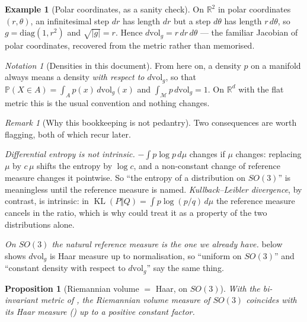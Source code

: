 \documentclass[11pt,a4paper]{report}
\newtheorem{proposition}[proposition]{Proposition}
\theoremstyle{definition}
\newtheorem{example}[example]{Example}
\theoremstyle{remark}
\newtheorem{remark}[remark]{Remark}
\newtheorem{notation}[notation]{Notation}
\DeclareMathOperator{\KL}{KL}
\newcommand{\RR}{\mathbb R}
\newcommand{\PP}{\mathbb P}
\begin{document}
\begin{example}[Polar coordinates, as a sanity check]
\label{ex:polar-volume}
On $\RR^2$ in polar coordinates $(r,\theta)$, an infinitesimal step $dr$ has
length $dr$ but a step $d\theta$ has length $r\,d\theta$, so
$g=\mathrm{diag}(1,r^2)$ and $\sqrt{|g|}=r$. Hence
$d\mathrm{vol}_g=r\,dr\,d\theta$ --- the familiar Jacobian of polar
coordinates, recovered from the metric rather than memorised.
\end{example}

\begin{notation}[Densities in this document]
\label{not:density-reference}
From here on, a density $p$ on a manifold always means a density
\emph{with respect to $d\mathrm{vol}_g$}, so that
$\PP(X\in A)=\int_Ap(x)\,d\mathrm{vol}_g(x)$ and
$\int_{\mathcal M}p\,d\mathrm{vol}_g=1$. On $\RR^d$ with the flat metric
this is the usual convention and nothing changes.
\end{notation}

\begin{remark}[Why this bookkeeping is not pedantry]
\label{rem:reference-measure-matters}
Two consequences are worth flagging, both of which recur later.

\emph{Differential entropy is not intrinsic.} $-\int p\log p\,d\mu$ changes
if $\mu$ changes: replacing $\mu$ by $c\,\mu$ shifts the entropy by
$\log c$, and a non-constant change of reference measure changes it
pointwise. So ``the entropy of a distribution on $SO(3)$'' is meaningless
until the reference measure is named. \emph{Kullback--Leibler divergence},
by contrast, is intrinsic: in $\KL(P\Vert Q)=\int p\log(p/q)\,d\mu$ the
reference measure cancels in the ratio, which is why
 could treat it as a property of the two distributions
alone.

\emph{On $SO(3)$ the natural reference measure is the one we already have.}
 below shows $d\mathrm{vol}_g$ is Haar measure
up to normalisation, so ``uniform on $SO(3)$'' and ``constant density with
respect to $d\mathrm{vol}_g$'' say the same thing.
\end{remark}

\begin{proposition}[Riemannian volume $=$ Haar, on $SO(3)$]
\label{prop:so3-haar-is-volume}
With the bi-invariant metric of , the
Riemannian volume measure of $SO(3)$ coincides with its Haar measure
() up to a positive constant factor.
\end{proposition}
\end{document}
